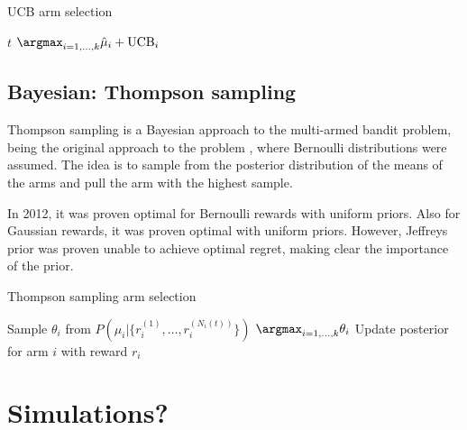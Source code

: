 \begin{algorithm}
    \caption{UCB arm selection}
    \label{alg:ucb}
    \begin{algorithmic}
        \State \Return $t$
        \Else
        \State \Return $\argmax_{i=1,\dots,k} \hat{\mu}_i + \text{UCB}_i$
        \EndIf
    \end{algorithmic}
\end{algorithm}




\subsection{Bayesian: Thompson sampling}
Thompson sampling is a Bayesian approach to the multi-armed bandit problem, being the original approach to the problem \cite{thompson1933}, where Bernoulli distributions were assumed.
The idea is to sample from the posterior distribution of the means of the arms and pull the arm with the highest sample.

In 2012, it was proven optimal for Bernoulli rewards \cite{kaufmann2012} with uniform priors.
Also for Gaussian rewards, it was proven optimal \cite{honda2014} with uniform priors.
However, Jeffreys prior was proven unable to achieve optimal regret, making clear the importance of the prior.

\begin{algorithm}
    \caption{Thompson sampling arm selection}
    \label{alg:thompson}
    \begin{algorithmic}
        \State Sample $\theta_i$ from $P(\mu_i | \{r_i^{(1)}, \dots, r_i^{(N_i(t))}\})$
        \EndFor
        \State \Return $\argmax_{i=1,\dots,k} \theta_i$
        \State Update posterior for arm $i$ with reward $r_i$
    \end{algorithmic}
\end{algorithm}

\section{Simulations?}